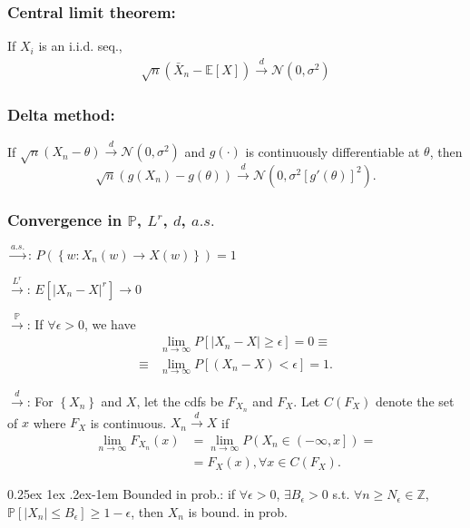 \documentclass[9pt]{extarticle}
\makeatletter
\newcommand{\PP}{\mathbb{P}}
\newcommand{\EE}{\mathbb{E}}
\newcommand{\ZZ}{\mathbb{Z}}
\renewcommand{\paragraph}{%
  \@startsection{paragraph}{4}%
  {\z@}{0.25ex \@plus 1ex \@minus .2ex}{-1em}%
  {\normalfont\normalsize\bfseries}%
}
\newcommand{\darrow}{\overset{d}{\rightarrow}}
\newcommand{\parrow}{\overset{\PP}{\rightarrow}}
\newcommand{\asarrow}{\overset{a.s.}{\rightarrow}}
\newenvironment{noshow}{}{}
\makeatother
\begin{document}
\begin{multicols*}{4}
\begin{noshow}
\subsubsection*{Central limit theorem:} If $X_i$ is an i.i.d. seq.,
\begin{gather*}
    \sqrt{n}(\bar{X}_n - \EE[X]) \darrow \mathcal{N}(0, \sigma^2)
\end{gather*}

\subsubsection*{Delta method:}
If $\sqrt{n}(X_n - \theta) \darrow \mathcal{N}(0, \sigma^2)$ and $g(\cdot)$ is continuously differentiable at $\theta$, then
\begin{equation*}
    \sqrt{n}(g(X_n) - g(\theta)) \darrow \mathcal{N}(0, \sigma^2[g'(\theta)]^2).
\end{equation*}
\end{noshow}

\subsubsection*{Convergence in $\PP$, $L^r$, $d$, $a.s.$}
$\asarrow$: $P\left(\left\{ w:X_{n}\left(w\right)\rightarrow X\left(w\right)\right\} \right)=1$

$\overset{L^r}{\rightarrow}$: $E\left[\left|X_{n}-X\right|^{r}\right]\rightarrow0$

$\parrow$: If $\forall \epsilon>0$, we have
\begin{align*}
    &\underset{n\rightarrow\infty}{\lim}P\left[\left|X_{n}-X\right|\geq\epsilon\right]=0 \equiv \\ \equiv &\underset{n\rightarrow\infty}{\lim}P\left[\left(X_{n}-X\right)<\epsilon\right]=1.
\end{align*}

$\darrow$: For $\left\{ X_{n}\right\}$ and $X$, let the cdfs be $F_{X_{n}}$ and $F_{X}$. Let $C\left(F_{X}\right)$ denote the set of $x$ where $F_{X}$ is continuous. $X_{n} \darrow X$ if
\begin{align*}
    \underset{n\rightarrow\infty}{\lim}F_{X_{n}}\left(x\right) &= \underset{n\rightarrow\infty}{\lim}P\left(X_{n}\in\left(-\infty,x\right]\right)= \\
    & = F_{X}\left(x\right), \forall x\in C\left(F_{X}\right).
\end{align*}

\paragraph{Bounded in prob.:} if $\forall\epsilon>0$, $\exists B_\epsilon > 0$ s.t. $\forall n\geq N_{\epsilon} \in \ZZ$, $\PP[|X_{n}|\leq B_{\epsilon}]\geq 1-\epsilon$, then $X_n$ is bound. in prob.


\end{multicols*}
\end{document}
